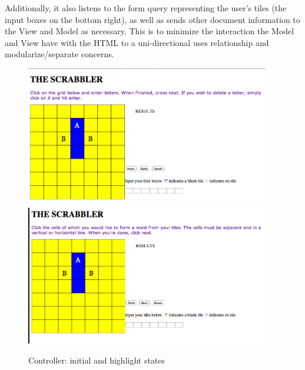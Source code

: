 \documentclass[11pt, oneside]{article}
\begin{document}
Additionally, it also listens to the form query representing the user's tiles (the input boxes on the bottom right), as well as sends other document information to the View and Model as necessary.  This is to minimize the interaction the Model and View have with the HTML to a uni-directional uses relationship and modularize/separate concerns.  

\begin{figure}[hl]
\caption{Controller: initial and highlight states}
\includegraphics[width=0.95\textwidth]{c1.png}
\includegraphics[width=0.95\textwidth]{c2.png}
\end{figure}
\end{document}
